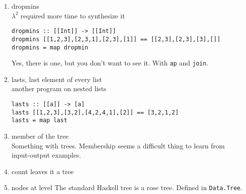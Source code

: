 \begin{enumerate}
%
	\item dropmins \\
	$\lambda^2$ required more time to synthesize it
	\begin{lstlisting}
dropmins :: [[Int]] -> [[Int]]
dropmins [[1,2,3],[2,3,1],[2,3],[1]] == [[2,3],[2,3],[3],[]]
dropmins = map dropmin
	\end{lstlisting}
	 Yes, there is one, but you don't want to see it. With \lstinline?ap? and \lstinline?join?.
%
	\item lasts, last element of every list \\
	another program on nested lists
	\begin{lstlisting}
lasts :: [[a]] -> [a]
lasts [[1,2,3],[3,2],[4,2,4,1],[2]] == [3,2,1,2]
lasts = map last
	\end{lstlisting}
%
	\item member of the tree\\
	Something with trees. Membership seems a difficult thing to learn from input-output examples.
%
	\item count leaves it a tree
%
	\item nodes at level
	The standard Haskell tree is a rose tree. Defined in \lstinline?Data.Tree?.
	
\end{enumerate}




